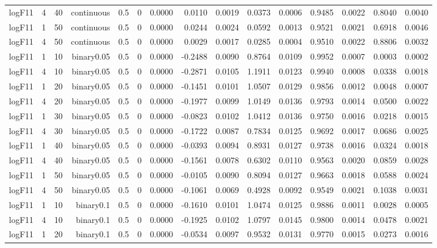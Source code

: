 \begin{longtable}{rrrrrrrrrrrrrrr}
  logF11 & 4 & 40 & continuous & 0.5 & 0 & 0.0000 & 0.0110 & 0.0019 & 0.0373 & 0.0006 & 0.9485 & 0.0022 & 0.8040 & 0.0040 \\ 
  logF11 & 1 & 50 & continuous & 0.5 & 0 & 0.0000 & 0.0244 & 0.0024 & 0.0592 & 0.0013 & 0.9521 & 0.0021 & 0.6918 & 0.0046 \\ 
  logF11 & 4 & 50 & continuous & 0.5 & 0 & 0.0000 & 0.0029 & 0.0017 & 0.0285 & 0.0004 & 0.9510 & 0.0022 & 0.8806 & 0.0032 \\ 
  logF11 & 1 & 10 & binary0.05 & 0.5 & 0 & 0.0000 & -0.2488 & 0.0090 & 0.8764 & 0.0109 & 0.9952 & 0.0007 & 0.0003 & 0.0002 \\ 
  logF11 & 4 & 10 & binary0.05 & 0.5 & 0 & 0.0000 & -0.2871 & 0.0105 & 1.1911 & 0.0123 & 0.9940 & 0.0008 & 0.0338 & 0.0018 \\ 
  logF11 & 1 & 20 & binary0.05 & 0.5 & 0 & 0.0000 & -0.1451 & 0.0101 & 1.0507 & 0.0129 & 0.9856 & 0.0012 & 0.0048 & 0.0007 \\ 
  logF11 & 4 & 20 & binary0.05 & 0.5 & 0 & 0.0000 & -0.1977 & 0.0099 & 1.0149 & 0.0136 & 0.9793 & 0.0014 & 0.0500 & 0.0022 \\ 
  logF11 & 1 & 30 & binary0.05 & 0.5 & 0 & 0.0000 & -0.0823 & 0.0102 & 1.0412 & 0.0136 & 0.9750 & 0.0016 & 0.0218 & 0.0015 \\ 
  logF11 & 4 & 30 & binary0.05 & 0.5 & 0 & 0.0000 & -0.1722 & 0.0087 & 0.7834 & 0.0125 & 0.9692 & 0.0017 & 0.0686 & 0.0025 \\ 
  logF11 & 1 & 40 & binary0.05 & 0.5 & 0 & 0.0000 & -0.0393 & 0.0094 & 0.8931 & 0.0127 & 0.9738 & 0.0016 & 0.0324 & 0.0018 \\ 
  logF11 & 4 & 40 & binary0.05 & 0.5 & 0 & 0.0000 & -0.1561 & 0.0078 & 0.6302 & 0.0110 & 0.9563 & 0.0020 & 0.0859 & 0.0028 \\ 
  logF11 & 1 & 50 & binary0.05 & 0.5 & 0 & 0.0000 & -0.0105 & 0.0090 & 0.8094 & 0.0127 & 0.9663 & 0.0018 & 0.0588 & 0.0024 \\ 
  logF11 & 4 & 50 & binary0.05 & 0.5 & 0 & 0.0000 & -0.1061 & 0.0069 & 0.4928 & 0.0092 & 0.9549 & 0.0021 & 0.1038 & 0.0031 \\ 
  logF11 & 1 & 10 & binary0.1 & 0.5 & 0 & 0.0000 & -0.1610 & 0.0101 & 1.0474 & 0.0125 & 0.9886 & 0.0011 & 0.0028 & 0.0005 \\ 
  logF11 & 4 & 10 & binary0.1 & 0.5 & 0 & 0.0000 & -0.1925 & 0.0102 & 1.0797 & 0.0145 & 0.9800 & 0.0014 & 0.0478 & 0.0021 \\ 
  logF11 & 1 & 20 & binary0.1 & 0.5 & 0 & 0.0000 & -0.0534 & 0.0097 & 0.9532 & 0.0131 & 0.9770 & 0.0015 & 0.0273 & 0.0016 \\ 

\end{longtable}
